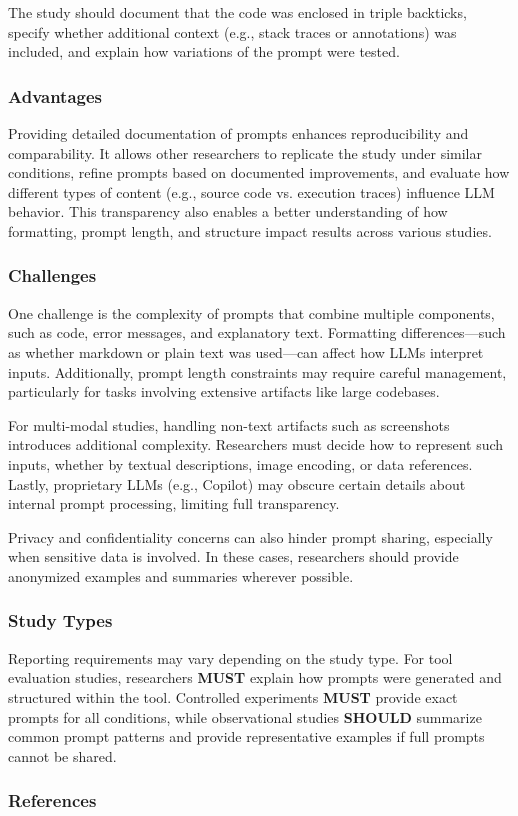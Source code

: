 \documentclass[11pt]{article}
\begin{document}
The study should document that the code was enclosed in triple backticks, specify whether additional context (e.g., stack traces or annotations) was included, and explain how variations of the prompt were tested.

\subsubsection{Advantages}
Providing detailed documentation of prompts enhances reproducibility and comparability. It allows other researchers to replicate the study under similar conditions, refine prompts based on documented improvements, and evaluate how different types of content (e.g., source code vs. execution traces) influence LLM behavior. This transparency also enables a better understanding of how formatting, prompt length, and structure impact results across various studies.

\subsubsection{Challenges}
One challenge is the complexity of prompts that combine multiple components, such as code, error messages, and explanatory text. Formatting differences—such as whether markdown or plain text was used—can affect how LLMs interpret inputs. Additionally, prompt length constraints may require careful management, particularly for tasks involving extensive artifacts like large codebases.

For multi-modal studies, handling non-text artifacts such as screenshots introduces additional complexity. Researchers must decide how to represent such inputs, whether by textual descriptions, image encoding, or data references. Lastly, proprietary LLMs (e.g., Copilot) may obscure certain details about internal prompt processing, limiting full transparency.

Privacy and confidentiality concerns can also hinder prompt sharing, especially when sensitive data is involved. In these cases, researchers should provide anonymized examples and summaries wherever possible.

\subsubsection{Study Types}
Reporting requirements may vary depending on the study type. For tool evaluation studies, researchers \textbf{MUST} explain how prompts were generated and structured within the tool. Controlled experiments \textbf{MUST} provide exact prompts for all conditions, while observational studies \textbf{SHOULD} summarize common prompt patterns and provide representative examples if full prompts cannot be shared.

\subsubsection{References}



\end{document}
